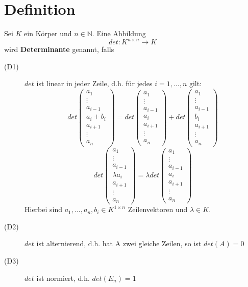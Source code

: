 \documentclass{scrbook}
\begin{document}
\section{Definition}
Sei $K$ ein Körper und $n\in \mathbb{N}$. Eine Abbildung \[det: K^{n \times n} \to K\] wird \textbf{Determinante} genannt, falls
\begin{description}
\item[(D1)] $det$ ist linear in jeder Zeile, d.h. für jedes $i=1,...,n$ gilt:
\[det\left(
\begin{array}{c}
a_1\\\vdots\\a_{i-1}\\a_i+b_i\\a_{i+1}\\\vdots\\a_n
\end{array}
\right) = det\left(
\begin{array}{c}
a_1\\\vdots\\a_{i-1}\\a_i\\a_{i+1}\\\vdots\\a_n
\end{array}
\right)+ det \left(
\begin{array}{c}
a_1\\\vdots\\a_{i-1}\\b_i\\a_{i+1}\\\vdots\\a_n
\end{array}
\right)\]
\[det\left(
\begin{array}{c}
a_1\\\vdots\\a_{i-1}\\\lambda a_i\\a_{i+1}\\\vdots\\a_n
\end{array}
\right) = \lambda det\left(
\begin{array}{c}
a_1\\\vdots\\a_{i-1}\\a_i\\a_{i+1}\\\vdots\\a_n
\end{array}
\right)\]
Hierbei sind $a_1,...,a_n,b_i \in K^{1\times n}$ Zeilenvektoren und $\lambda \in K$.
\item[(D2)] $det$ ist alternierend, d.h. hat A zwei gleiche Zeilen, so ist $det(A) = 0$
\item[(D3)] $det$ ist normiert, d.h. $det(E_n) = 1$
\end{description}
\end{document}
